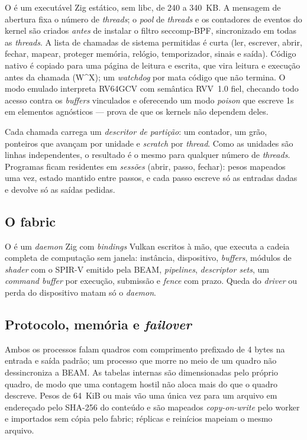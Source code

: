 O  é um executável Zig estático, sem libc, de 240 a 340~KB. A mensagem de abertura fixa o número de \textit{threads}; o \textit{pool} de \textit{threads} e os contadores de eventos do kernel são criados \emph{antes} de instalar o filtro seccomp-BPF, sincronizado em todas as \textit{threads}. A lista de chamadas de sistema permitidas é curta (ler, escrever, abrir, fechar, mapear, proteger memória, relógio, temporizador, sinais e saída). Código nativo é copiado para uma página de leitura e escrita, que vira leitura e execução antes da chamada (W\^{}X); um \textit{watchdog} por  mata código que não termina. O modo emulado interpreta RV64GCV com semântica RVV~1.0 fiel, checando todo acesso contra os \textit{buffers} vinculados e oferecendo um modo \textit{poison} que escreve 1s em elementos agnósticos --- prova de que os kernels não dependem deles.

Cada chamada carrega um \emph{descritor de partição}: um contador, um grão, ponteiros que avançam por unidade e \textit{scratch} por \textit{thread}. Como as unidades são linhas independentes, o resultado é o mesmo para qualquer número de \textit{threads}. Programas ficam residentes em \emph{sessões} (abrir, passo, fechar): pesos mapeados uma vez, estado mantido entre passos, e cada passo escreve só as entradas dadas e devolve só as saídas pedidas.

\subsection{O fabric}

O  é um \textit{daemon} Zig com \textit{bindings} Vulkan escritos à mão, que executa a cadeia completa de computação sem janela: instância, dispositivo, \textit{buffers}, módulos de \textit{shader} com o SPIR-V emitido pela BEAM, \textit{pipelines}, \textit{descriptor sets}, um \textit{command buffer} por execução, submissão e \textit{fence} com prazo. Queda do \textit{driver} ou perda do dispositivo matam só o \textit{daemon}.

\subsection{Protocolo, memória e \textit{failover}}

Ambos os processos falam quadros com comprimento prefixado de 4 bytes na entrada e saída padrão; um processo que morre no meio de um quadro não dessincroniza a BEAM. As tabelas internas são dimensionadas pelo próprio quadro, de modo que uma contagem hostil não aloca mais do que o quadro descreve. Pesos de 64~KiB ou mais vão uma única vez para um arquivo em  endereçado pelo SHA-256 do conteúdo e são mapeados \textit{copy-on-write} pelo worker e importados sem cópia pelo fabric; réplicas e reinícios mapeiam o mesmo arquivo.

